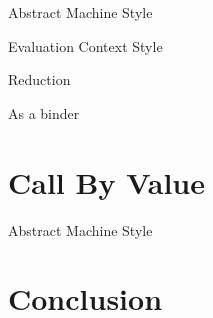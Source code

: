 \documentclass{article}
\begin{document}
\begin{multicols}{2}

\noindent
Abstract Machine Style


\begin{scriptsize}
\end{scriptsize}

\noindent
Evaluation Context Style


\begin{scriptsize}
  
  
\end{scriptsize}

\end{multicols}

\begin{multicols}{2}
Reduction


\noindent
As a binder

\end{multicols}


\section{Call By Value }
Abstract Machine Style


\begin{scriptsize}
\end{scriptsize}



\section{Conclusion}




\begin{scriptsize}
 
  
\end{scriptsize}
\end{document}
